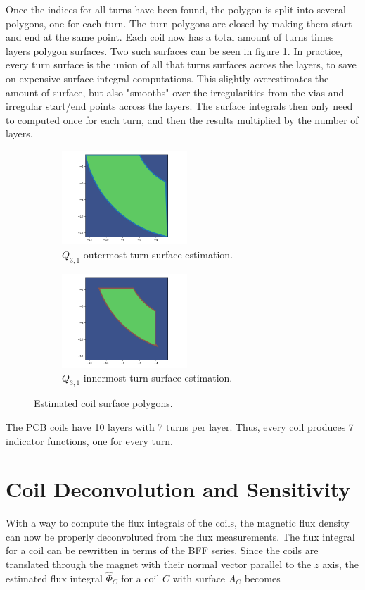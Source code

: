 Once the indices for all turns have been found, the polygon is
split into several polygons, one for each turn. The turn polygons
are closed by making them start and end at the same point. Each
coil now has a total amount of turns times layers polygon surfaces.
Two such surfaces can be seen in figure \ref{fig:coilsurfaces}.
In practice, every turn surface is the union of all that turns
surfaces across the layers, to save on expensive surface
integral computations. This slightly
overestimates the amount of surface, but also "smooths" over
the irregularities from the vias and irregular start/end points
across the layers. The surface integrals then only need to
computed once for each turn, and then the results multiplied
by the number of layers.

\begin{figure}[!h]
    \centering
    \begin{subfigure}[b]{0.4\textwidth}
        \centering
        \includegraphics[height=100pt]{figs/Q11-layer0}
        \caption{$Q_{3,1}$ outermost turn surface estimation.}
    \end{subfigure}
    \hfill
    \begin{subfigure}[b]{0.4\textwidth}
        \centering
        \includegraphics[height=100pt]{figs/Q11-layer5}
        \caption{$Q_{3,1}$ innermost turn surface estimation.}
    \end{subfigure}
    \caption{Estimated coil surface polygons.}
    \label{fig:coilsurfaces}
\end{figure}

The PCB coils have 10 layers with 7 turns per layer. Thus, every
coil produces 7 indicator functions, one for every turn.


\section{Coil Deconvolution and Sensitivity}
\label{sec:coil-deconvolution}
With a way to compute the flux integrals of the coils, the
magnetic flux density can now be properly deconvoluted
from the flux measurements. The flux integral for a
coil can be rewritten in terms of the BFF series.
Since the coils are translated through the magnet
with their normal vector parallel to the $z$ axis, the estimated
flux integral $\hat{\Phi}_C$
for a coil $C$ with surface $A_C$ becomes

